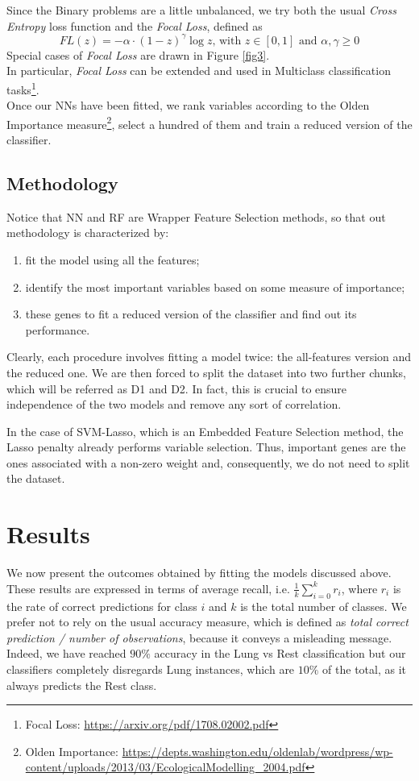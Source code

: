 \documentclass[a4paper,11pt, oneside]{article}  %
\begin{document}
Since the Binary problems are a little unbalanced, we try both the usual \textit{Cross Entropy} loss function and the \textit{Focal Loss}, defined as 
\begin{equation*}
	FL(z) = - \alpha \cdot (1 - z)^{\gamma} \log{z} \text{, with }z \in [0,1]  \text{ and } \alpha,  \gamma \geq 0
\end{equation*}
Special cases of \textit{Focal Loss} are drawn in Figure \ref{fig3}. \\
In particular, \textit{Focal Loss} can be extended and used in Multiclass classification tasks\footnote{Focal Loss: \url{https://arxiv.org/pdf/1708.02002.pdf}}. \\
Once our NNs have been fitted, we rank variables according to the Olden Importance measure\footnote{Olden Importance: \url{https://depts.washington.edu/oldenlab/wordpress/wp-content/uploads/2013/03/EcologicalModelling_2004.pdf}},  select a hundred of them and train a reduced version of the classifier. 

\subsection{Methodology}
Notice that NN and RF are Wrapper Feature Selection methods, so that out methodology is characterized by:
\begin{enumerate}
	\item fit the model using all the features;
	\item identify the most important variables based on some measure of importance; \item these genes to fit a reduced version of the classifier and find out its performance.
\end{enumerate} 
Clearly, each procedure involves fitting a model twice: the all-features version and the reduced one.  We are then forced to split the dataset into two further chunks, which will be referred as D1 and D2. In fact, this is crucial to ensure independence of the two models and remove any sort of correlation.

In the case of SVM-Lasso, which is an Embedded Feature Selection method, the Lasso penalty already performs variable selection. Thus, important genes are the ones associated with a non-zero weight and, consequently, we do not need to split the dataset. 

\section{Results}
We now present the outcomes obtained by fitting the models discussed above. These results are expressed in terms of average recall, i.e. $\frac{1}{k} \sum\limits_{i = 0 }^k r_i$, where $r_i$ is the rate of correct predictions for class $i$ and $k$ is the total number of classes. We prefer not to rely on the usual accuracy measure,  which is defined as \textit{total correct prediction / number of observations}, because it conveys a misleading message.  Indeed,  we have reached $90\%$ accuracy in the Lung vs Rest classification but our classifiers completely disregards Lung instances, which are $10\%$ of the total, as it always predicts the Rest class.  
\end{document}

